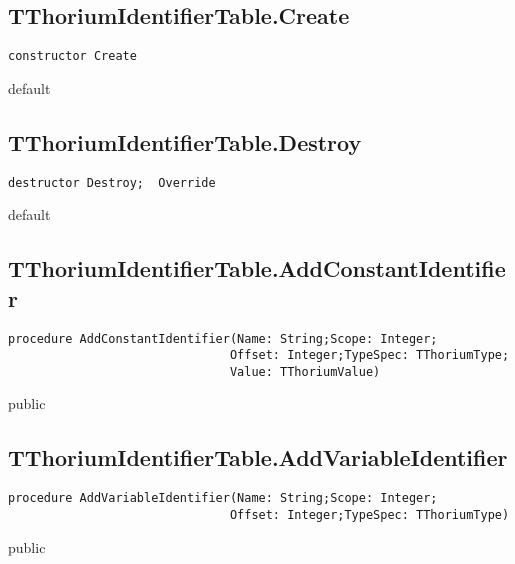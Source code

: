 \subsection{TThoriumIdentifierTable.Create}
\label{thoriumcore:thorium:tthoriumidentifiertable:create}
\begin{FPCList}
\Synopsis
\Declaration 

\begin{verbatim}
constructor Create
\end{verbatim}
\Visibility
default
\Description
\Errors
\end{FPCList}
\subsection{TThoriumIdentifierTable.Destroy}
\label{thoriumcore:thorium:tthoriumidentifiertable:destroy}
\begin{FPCList}
\Synopsis
\Declaration 

\begin{verbatim}
destructor Destroy;  Override
\end{verbatim}
\Visibility
default
\Description
\Errors
\end{FPCList}
\subsection{TThoriumIdentifierTable.AddConstantIdentifier}
\label{thoriumcore:thorium:tthoriumidentifiertable:addconstantidentifier}
\begin{FPCList}
\Synopsis
\Declaration 

\begin{verbatim}
procedure AddConstantIdentifier(Name: String;Scope: Integer;
                               Offset: Integer;TypeSpec: TThoriumType;
                               Value: TThoriumValue)
\end{verbatim}
\Visibility
public
\Description
\Errors
\end{FPCList}
\subsection{TThoriumIdentifierTable.AddVariableIdentifier}
\label{thoriumcore:thorium:tthoriumidentifiertable:addvariableidentifier}
\begin{FPCList}
\Synopsis
\Declaration 

\begin{verbatim}
procedure AddVariableIdentifier(Name: String;Scope: Integer;
                               Offset: Integer;TypeSpec: TThoriumType)
\end{verbatim}
\Visibility
public
\Description
\Errors
\end{FPCList}
